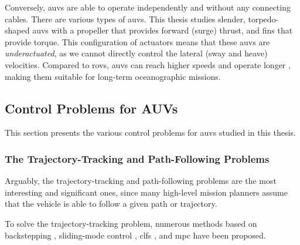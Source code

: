 Conversely, \glspl{auv} are able to operate independently and without any connecting cables.
There are various types of \glspl{auv}.
This thesis studies slender, torpedo-shaped \glspl{auv} with a propeller that provides forward (surge) thrust, and fins that provide torque.
This configuration of actuators means that these \glspl{auv} are \emph{underactuated}, as we cannot directly control the lateral (sway and heave) velocities.
Compared to \glspl{rov}, \glspl{auv} can reach higher speeds and operate longer \cite{sousa_LAUV_2012,purcell_remus_2000}, making them suitable for long-term oceanographic missions.

\subsection{Control Problems for AUVs}

This section presents the various control problems for \glspl{auv} studied in this thesis.

\subsubsection{The Trajectory-Tracking and Path-Following Problems}

Arguably, the trajectory-tracking and path-following problems are the most interesting and significant ones,
since many high-level mission planners assume that the vehicle is able to follow a given path or trajectory.


To solve the trajectory-tracking problem, numerous methods based on backstepping \cite{rezazadegan_trajectory-tracking-backstepping_2015,alonge_trajectory-tracking-backstepping_2001}, sliding-mode control \cite{elmokadem_trajectory-tracking-SMC_2016}, \glspl{clf} \cite{aguiar_trajectory-tracking-CLF_2007}, and \gls{mpc} \cite{abdelaal_trajectory-tracking-MPC_2015} have been proposed. 

